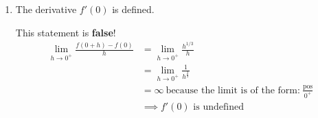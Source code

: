 \documentclass[nooutcomes]{ximera}
\begin{document}
\begin{problem}
\begin{enumerate}
    \item  The derivative $f'(0)$ is defined.
      \begin{freeResponse}
        This statement is \textbf{false}!
        \begin{align*}
          \lim_{h \to 0^+} \frac{f(0  + h) - f(0)}{h}
          &= \lim_{h \to 0^+} \frac{h^{1/3}}{h} \\
          &= \lim_{h \to 0^+} \frac{1}{h^{\frac{2}{3}}} \\	
          &= \infty\ \text{because the limit is of the form:}\ \frac{\text{pos}}{0^+}\\
          &\implies \mbox{$f'(0)$ is undefined}
        \end{align*}
      \end{freeResponse}
  \end{enumerate}
\end{problem}	
	
\end{document}
